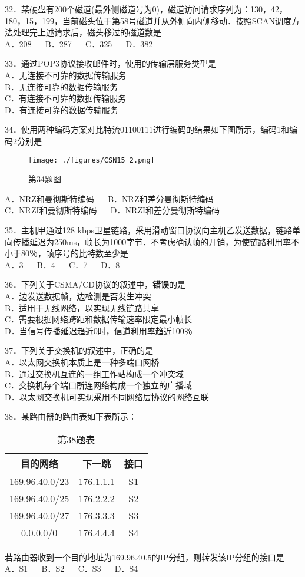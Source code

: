 32．某硬盘有200个磁道(最外侧磁道号为0)，磁道访问请求序列为：130，42，180，15，199，当前磁头位于第58号磁道并从外侧向内侧移动．按照SCAN调度方法处理完上述请求后，磁头移过的磁道数是 \\
A．208 $\quad$ B．287 $\quad$ C．325 $\quad$ D．382

33．通过POP3协议接收邮件时，使用的传输层服务类型是 \\
A．无连接不可靠的数据传输服务 \\
B．无连接可靠的数据传输服务 \\
C．有连接不可靠的数据传输服务 \\
D．有连接可靠的数据传输服务

34．使用两种编码方案对比特流01100111进行编码的结果如下图所示，编码1和编码2分别是
\begin{figure}[ht]
\centering
\texttt{[image: ./figures/CSN15\_2.png]}
\caption{第34题图} \label{CSN15_fig2}
\end{figure}
A．NRZ和曼彻斯特编码 $\quad$ B．NRZ和差分曼彻斯特编码 \\
C．NRZI和曼彻斯特编码 $\quad$ D．NRZI和差分曼彻斯特编码

35．主机甲通过128 kbps卫星链路，采用滑动窗口协议向主机乙发送数据，链路单向传播延迟为250ms，帧长为1000字节．不考虑确认帧的开销，为使链路利用率不小于80％，帧序号的比特数至少是 \\
A．3 $\quad$ B．4 $\quad$ C．7 $\quad$ D．8

36．下列关于CSMA/CD协议的叙述中，\textbf{错误}的是 \\
A．边发送数据帧，边检测是否发生冲突 \\
B．适用于无线网络，以实现无线链路共享 \\
C．需要根据网络跨距和数据传输速率限定最小帧长 \\
D．当信号传播延迟趋近0时，信道利用率趋近100％

37．下列关于交换机的叙述中，正确的是 \\
A．以太网交换机本质上是一种多端口网桥 \\
B．通过交换机互连的一组工作站构成一个冲突域 \\
C．交换机每个端口所连网络构成一个独立的广播域 \\
D．以太网交换机可实现采用不同网络层协议的网络互联

38．某路由器的路由表如下表所示：
\begin{table}[ht]
\centering
\caption{第38题表}\label{CSN15_tab1}
\begin{tabular}{|c|c|c|}
\hline
目的网络 & 下一跳 & 接口 \\
\hline
169.96.40.0/23 & 176.1.1.1 & S1 \\
\hline
169.96.40.0/25 & 176.2.2.2 & S2 \\
\hline
169.96.40.0/27 & 176.3.3.3 & S3 \\
\hline
0.0.0.0/0 & 176.4.4.4 & S4 \\
\hline
\end{tabular}
\end{table}
若路由器收到一个目的地址为169.96.40.5的IP分组，则转发该IP分组的接口是 \\
A．S1 $\quad$ B．S2 $\quad$ C．S3 $\quad$ D．S4

